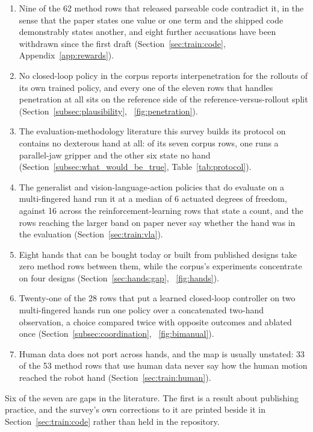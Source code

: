 \begin{enumerate}
\item Nine of the 62 method rows that released parseable code contradict it, in the sense that the
paper states one value or one term and the shipped code demonstrably states another, and eight
further accusations have been withdrawn since the first draft
(Section~\ref{sec:train:code}, Appendix~\ref{app:rewards}).

\item No closed-loop policy in the corpus reports interpenetration for the rollouts of its own
trained policy, and every one of the eleven rows that handles penetration at all sits on the
reference side of the reference-versus-rollout split
(Section~\ref{subsec:plausibility}, \figurename~\ref{fig:penetration}).

\item The evaluation-methodology literature this survey builds its protocol on contains no
dexterous hand at all: of its seven corpus rows, one runs a parallel-jaw gripper and the other six
state no hand (Section~\ref{subsec:what_would_be_true}, Table~\ref{tab:protocol}).

\item The generalist and vision-language-action policies that do evaluate on a multi-fingered hand
run it at a median of 6 actuated degrees of freedom, against 16 across the reinforcement-learning
rows that state a count, and the rows reaching the larger band on paper never say whether the hand
was in the evaluation (Section~\ref{sec:train:vla}).

\item Eight hands that can be bought today or built from published designs take zero method rows
between them, while the corpus's experiments concentrate on four designs
(Section~\ref{sec:hands:gap}, \figurename~\ref{fig:hands}).

\item Twenty-one of the 28 rows that put a learned closed-loop controller on two multi-fingered
hands run one policy over a concatenated two-hand observation, a choice compared twice with opposite
outcomes and ablated once (Section~\ref{subsec:coordination}, \figurename~\ref{fig:bimanual}).

\item Human data does not port across hands, and the map is usually unstated: 33 of the 53 method
rows that use human data never say how the human motion reached the robot hand
(Section~\ref{sec:train:human}).
\end{enumerate}

Six of the seven are gaps in the literature. The first is a result about publishing practice, and
the survey's own corrections to it are printed beside it in Section~\ref{sec:train:code} rather than
held in the repository.
